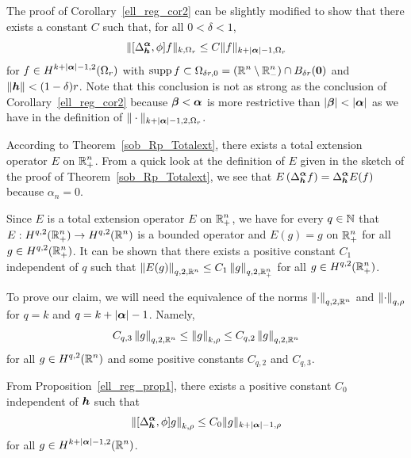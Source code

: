 \begin{rmk}
The proof of Corollary~\ref{ell_reg_cor2} can be slightly modified
to show that there exists a constant $C$ such that, for all $0 < \delta <1$, 
\[
  \| [\Delta^{{\bm{\alpha}}}_{{\bm{h}}}, \phi] f \|_{k,\Omega_r}
\leq C \| f \|_{k+|{\bm{\alpha}}|-1,\Omega_r}
\]
for $\displaystyle f \in H^{k+|{\bm{\alpha}}|-1,2}(\Omega_r)$ with
$\displaystyle \operatorname{supp} f \subset \Omega_{\delta r,0}
= (\mathbb{R}^n \setminus \mathbb{R}^n_-) \cap B_{\delta r}({\bm{0}})$ and
$\|{\bm{h}}\|<(1-\delta)r$.
Note that this conclusion is not as strong as the conclusion of
Corollary~\ref{ell_reg_cor2} because ${\bm{\beta}} < {\bm{\alpha}}$ is more
restrictive than $|{\bm{\beta}}| < |{\bm{\alpha}}|$ as we have in the
definition of $\displaystyle \| \cdot \|_{k+|{\bm{\alpha}}|-1,2,\Omega_r}$.

According to Theorem~\ref{sob_Rp_Totalext}, there exists a total
extension operator $E$ on $\displaystyle \mathbb{R}^n_+ $.  From a quick look
at the definition of $E$ given in the sketch of the proof of
Theorem~\ref{sob_Rp_Totalext}, we see
that $\displaystyle E\left( \Delta^{{\bm{\alpha}}}_{{\bm{h}}} f\right) =
\Delta^{{\bm{\alpha}}}_{{\bm{h}}} E(f)$ because $\alpha_n=0$.

Since $E$ is a total extension operator $E$ on $\displaystyle \mathbb{R}^n_+ $, we
have for every $q \in \mathbb{N}$ that
$\displaystyle E:H^{q,2}(\mathbb{R}^n_+) \to H^{q,2}(\mathbb{R}^n)$ is a
bounded operator and $E(g) = g$ on $\displaystyle \mathbb{R}^n_+$ for all
$\displaystyle g \in H^{q,2}(\mathbb{R}^n_+)$.  It can be
shown that there exists a positive constant $C_1$ independent of $q$ such that
$\displaystyle \left\| E(g) \right\|_{q,2,\mathbb{R}^n} \leq C_1
\left\| g \right\|_{q,2,\mathbb{R}^n_+}$ for all $\displaystyle g \in H^{q,2}(\mathbb{R}^n_+)$.

To prove our claim, we will need the equivalence of the norms
$\displaystyle \left\|\cdot\right\|_{q,2,\mathbb{R}^n}$ and 
$\displaystyle \left\|\cdot\right\|_{q,\rho}$ for $q=k$ and
$q=k+|{\bm{\alpha}}|-1$.
Namely,
\[
C_{q,3} \left\|g \right\|_{q,2,\mathbb{R}^n} \leq \left\|g \right\|_{k,\rho}
\leq C_{q,2} \left\|g \right\|_{q,2,\mathbb{R}^n}
\]
for all $\displaystyle g \in H^{q,2}(\mathbb{R}^n)$ and some positive
constants $C_{q,2}$ and $C_{q,3}$.

From Proposition~\ref{ell_reg_prop1}, there exists a positive constant $C_0$
independent of ${\bm{h}}$ such that
\[
\left\| [\Delta^{{\bm{\alpha}}}_{{\bm{h}}}, \phi] g \right\|_{k,\rho}
\leq C_0 \| g \|_{k+|{\bm{\alpha}}|-1,\rho}
\]
for all $\displaystyle g \in H^{k+|{\bm{\alpha}}|-1,2}(\mathbb{R}^n)$.


\end{rmk}
